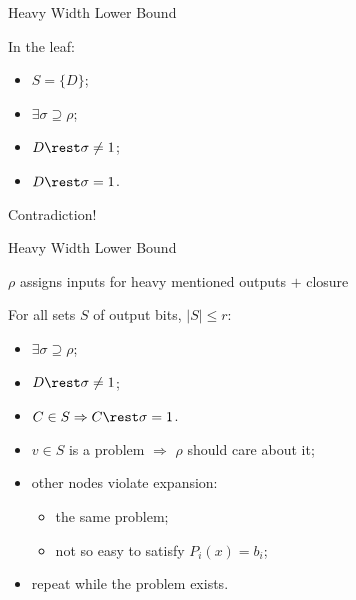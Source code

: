 \begin{frame}{Heavy Width Lower Bound}
    \pause
    \vspace{0.2cm}
    \begin{minipage}{0.4\linewidth}
        In the leaf:
        \begin{itemize}
            \item $S = \{D\}$;
                \pause
            \item $\exists \sigma \supseteq \rho$;
            \item $D \rest \sigma \neq 1$;
                \pause
            \item \alert{$D \rest \sigma = 1$}.
        \end{itemize}
    \end{minipage}
    \pause
    \begin{minipage}{0.5\linewidth}
        \centering
        \Huge Contradiction!
    \end{minipage}

\end{frame}


\begin{frame}{Heavy Width Lower Bound}

    $\rho$ assigns inputs for heavy mentioned outputs $+$ closure

    \vspace{0.2cm}

    \begin{minipage}{0.3\linewidth}
                
    \end{minipage}
    \begin{minipage}{0.65\linewidth}
        \pause
        For all sets $S$ of output bits, $|S| \le r$:
        \begin{itemize}
            \item $\exists \sigma \supseteq \rho$;
            \item $D \rest \sigma \neq 1$;
            \item $C \in S \Rightarrow
                C \rest \sigma = 1$.
        \end{itemize}

        \pause
        \pause
        \vspace{0.3cm}
        \begin{itemize}
            \item $v \in S$ is a problem $\Rightarrow$ $\rho$ should care about it;
                \pause
                \pause
            \item other nodes violate expansion:
                \begin{itemize}
                    \item the same problem;
                    \item not so easy to satisfy $P_i(x) = b_i$;
                \end{itemize}
                \pause
            \item repeat while the problem exists.
        \end{itemize}
    \end{minipage}
    
\end{frame}